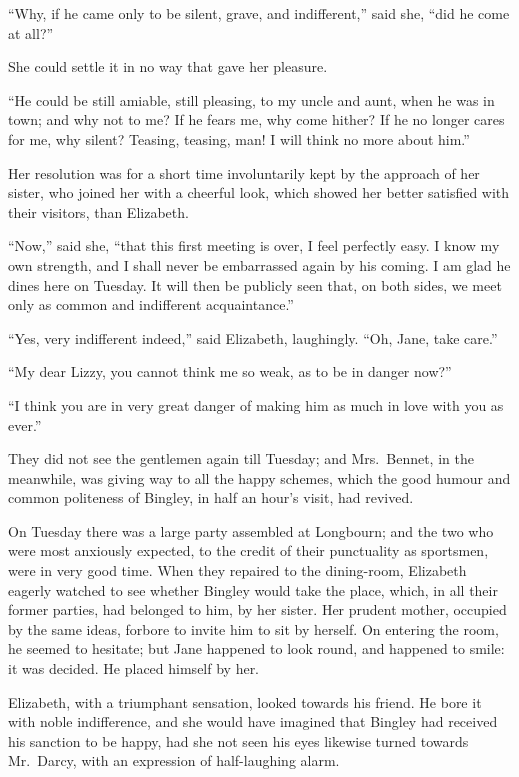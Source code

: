 \documentclass[12pt,english,oneside]{book}
\begin{document}
{}``Why, if he came only to be silent, grave, and indifferent,''
said she, {}``did he come at all?''\ 

She could settle it in no way that gave her pleasure.

{}``He could be still amiable, still pleasing, to my uncle and aunt,
when he was in town; and why not to me? If he fears me, why come hither?
If he no longer cares for me, why silent? Teasing, teasing, man! I
will think no more about him.''

Her resolution was for a short time involuntarily kept by the approach
of her sister, who joined her with a cheerful look, which showed her
better satisfied with their visitors, than Elizabeth.

{}``Now,'' said she, {}``that this first meeting is over, I feel
perfectly easy. I know my own strength, and I shall never be embarrassed
again by his coming. I am glad he dines here on Tuesday. It will then
be publicly seen that, on both sides, we meet only as common and indifferent
acquaintance.''

{}``Yes, very indifferent indeed,'' said Elizabeth, laughingly.
{}``Oh, Jane, take care.''

{}``My dear Lizzy, you cannot think me so weak, as to be in danger
now?''\ 

{}``I think you are in very great danger of making him as much in
love with you as ever.''

\bigskip{} They did not see the gentlemen again till Tuesday; and
Mrs.\ Bennet, in the meanwhile, was giving way to all the happy schemes,
which the good humour and common politeness of Bingley, in half an
hour's visit, had revived.

On Tuesday there was a large party assembled at Longbourn; and the
two who were most anxiously expected, to the credit of their punctuality
as sportsmen, were in very good time. When they repaired to the dining-room,
Elizabeth eagerly watched to see whether Bingley would take the place,
which, in all their former parties, had belonged to him, by her sister.
Her prudent mother, occupied by the same ideas, forbore to invite
him to sit by herself. On entering the room, he seemed to hesitate;
but Jane happened to look round, and happened to smile: it was decided.
He placed himself by her.

Elizabeth, with a triumphant sensation, looked towards his friend.
He bore it with noble indifference, and she would have imagined that
Bingley had received his sanction to be happy, had she not seen his
eyes likewise turned towards Mr.\ Darcy, with an expression of half-laughing
alarm.
\end{document}

